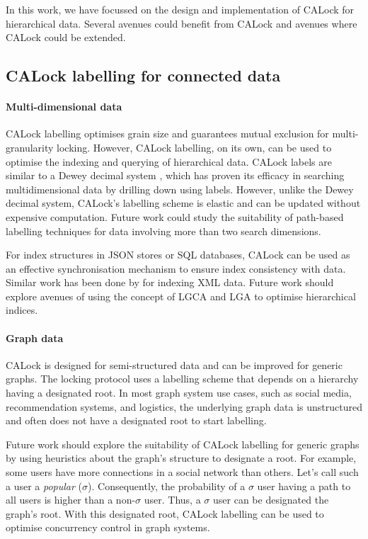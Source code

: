 In this work, we have focussed on the design and implementation of CALock for hierarchical data. Several avenues could benefit from CALock and avenues where CALock could be extended.

\subsection{CALock labelling for connected data}

\paragraph{Multi-dimensional data}

CALock labelling optimises grain size and guarantees mutual exclusion for multi-granularity locking. However, CALock labelling, on its own, can be used to optimise the indexing and querying of hierarchical data. CALock labels are similar to a Dewey decimal system \cite{DBLP:journals/jd/Sweeney83}, which has proven its efficacy in searching multidimensional data by drilling down using labels. However, unlike the Dewey decimal system, CALock's labelling scheme is elastic and can be updated without expensive computation. Future work could study the suitability of path-based labelling techniques for data involving more than two search dimensions. 

For index structures in JSON stores or SQL databases, CALock can be used as an effective synchronisation mechanism to ensure index consistency with data. Similar work has been done by \citet{DBLP:journals/pvldb/FinisBK0MF15} for indexing XML data. Future work should explore avenues of using the concept of LGCA and LGA to optimise hierarchical indices. 

\paragraph{Graph data}

CALock is designed for semi-structured data and can be improved for generic graphs. The locking protocol uses a labelling scheme that depends on a hierarchy having a designated root. In most graph system use cases, such as social media, recommendation systems, and logistics, the underlying graph data is unstructured and often does not have a designated root to start labelling. 

Future work should explore the suitability of CALock labelling for generic graphs by using heuristics about the graph's structure to designate a root. For example, some users have more connections in a social network than others. Let's call such a user a \emph{popular} ($\sigma$). Consequently, the probability of a $\sigma$ user having a path to all users is higher than a non-$\sigma$ user. Thus, a $\sigma$ user can be designated the graph's root. With this designated root, CALock labelling can be used to optimise concurrency control in graph systems.

